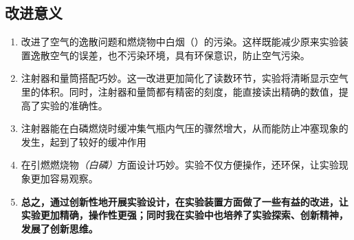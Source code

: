 \documentclass[11pt,a4paper,titlepage,twocolumn]{ctexart}
\begin{document}
	\subsection{改进意义}
	
	\begin{enumerate}
		\item 改进了空气的逸散问题和燃烧物中白烟（）的污染。这样既能减少原来实验装置逸散空气的误差，也不污染环境，具有环保意识，防止空气污染。
		\item 注射器和量筒搭配巧妙。这一改进更加简化了读数环节，实验将清晰显示空气里的体积。同时，注射器和量筒都有精密的刻度，能直接读出精确的数值，提高了实验的准确性。
		\item 注射器能在白磷燃烧时缓冲集气瓶内气压的骤然增大，从而能防止冲塞现象的发生，起到了较好的缓冲作用
		\item 在引燃燃烧物\textit{（白磷）}方面设计巧妙。实验不仅方便操作，还环保，让实验现象更加容易观察。
		\item \textbf{总之，通过创新性地开展实验设计，在实验装置方面做了一些有益的改进，让实验更加精确，操作性更强；同时我在实验中也培养了实验探索、创新精神，发展了创新思维。}
	\end{enumerate}
	
\end{document}
